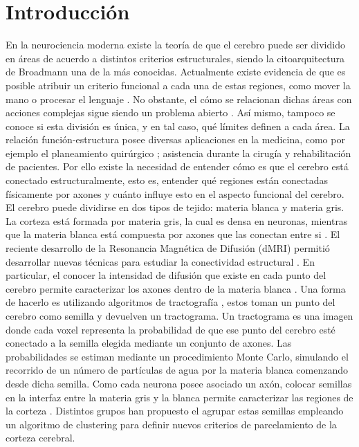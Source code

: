 \chapter{Introducci\'on}

En la neurociencia moderna existe la teor\'ia de que el cerebro
puede ser dividido en \'areas de acuerdo a distintos criterios estructurales,
siendo la citoarquitectura de Broadmann \cite{Brodmann1909} una de la m\'as conocidas.
Actualmente existe evidencia de que es posible atribuir un criterio funcional
a cada una de estas regiones, como mover la mano o procesar el lenguaje
\cite{Greicius2003}. No obstante, el c\'omo se relacionan dichas \'areas con acciones
complejas sigue siendo un problema abierto \cite{Barch2013}. As\'i mismo, tampoco
se conoce si esta divisi\'on es \'unica, y en tal caso, qu\'e l\'imites definen
a cada \'area. La relaci\'on funci\'on-estructura posee diversas aplicaciones en la
medicina, como por ejemplo el planeamiento quir\'urgico \cite{Stufflebeam2011}
\cite{Oishi2010}; asistencia durante la cirug\'ia \cite{Bello2008} y rehabilitaci\'on
\cite{Song2014} de pacientes. Por ello existe la necesidad de entender c\'omo es
que el cerebro est\'a conectado estructuralmente, esto es, entender qu\'e regiones
est\'an conectadas f\'isicamente por axones y cu\'anto influye esto en el aspecto
funcional del cerebro. \\

El cerebro puede dividirse en dos tipos de tejido: materia blanca y materia gris.
La corteza est\'a formada por materia gris, la cual es densa en neuronas, mientras
que la materia blanca est\'a compuesta por axones que las conectan entre si \cite{Dale2008}.
El reciente desarrollo de la Resonancia Magn\'etica de Difusi\'on (dMRI) permiti\'o
desarrollar nuevas t\'ecnicas para estudiar la conectividad estructural \cite{Taylor1985}. 
En particular, el conocer la intensidad de difusi\'on que existe en cada punto del 
cerebro permite caracterizar los axones dentro de la materia blanca \cite{Hagmann2006}.
Una forma de hacerlo es utilizando algoritmos de tractograf\'ia \cite{Descoteaux2009}
\cite{Jbabdi2007}, estos toman un punto del cerebro como semilla y devuelven un
tractograma. Un tractograma es una imagen donde cada voxel representa la
probabilidad de que ese punto del cerebro est\'e conectado a la semilla elegida
mediante un conjunto de axones. 
Las probabilidades se estiman mediante un procedimiento Monte Carlo, simulando el
recorrido de un n\'umero de part\'iculas de agua por la materia blanca comenzando
desde dicha semilla. Como cada neurona posee
asociado un ax\'on, colocar semillas en la interfaz entre la materia gris y la
blanca permite caracterizar las regiones de la corteza \cite{Mori2002}
\cite{Anwander2006}. Distintos grupos han propuesto el agrupar estas semillas
empleando un algoritmo de clustering para definir nuevos criterios de parcelamiento
de la corteza cerebral. \\


